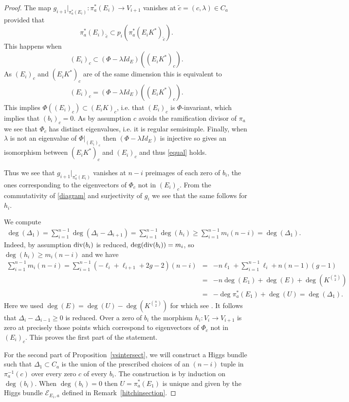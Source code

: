 \documentclass[12pt]{article}
\numberwithin{equation}{section}
\renewcommand{\div}{{\rm div}}
\theoremstyle{remark}
\theoremstyle{definition}
\numberwithin{theorem}{section}
\def\beq{\begin{eqnarray}}
\def\eeq{\end{eqnarray}}
\def\bes{\begin{eqnarray*}}
\def\ees{\end{eqnarray*}}
\def\calE{{\mathcal E}}
\renewcommand{\1}{\mathbbm{1}}
\begin{document}
\begin{proof}
	The map $g_{i+1}|_{\pi_a^*(E_{i})}:\pi_a^*(E_{i})\to V_{i+1}$ vanishes at $\tilde{c}=(c,\lambda)\in C_a$ provided that $$\pi_a^*(E_{i})_{\tilde{c}}\subset p_i(\pi_a^*(E_iK^*)_{\tilde{c}}).$$ This happens when
	$$(E_{i})_c\subset (\Phi-\lambda Id_{E})((E_iK^*)_c).$$ As $(E_{i})_c$ and $(E_iK^*)_c$ are of the same dimension this 
	is equivalent to \beq \label{equal}(E_{i})_c= (\Phi-\lambda Id_{E})((E_iK^*)_c).\eeq  This implies $\Phi((E_i)_c)\subset (E_iK)_c$, i.e. that $(E_i)_c$ is $\Phi$-invariant, which implies that $(b_i)_c=0$. As by assumption $c$ avoids the ramification divisor of $\pi_a$ we see that $\Phi_c$ has distinct eigenvalues, i.e. it is regular semisimple.  Finally, when $\lambda$ is not an eigenvalue of $\Phi|_{(E_i)_c}$ then $(\Phi-\lambda Id_{E})$ is injective so gives an isomorphism between   $(E_iK^*)_c$ and $(E_{i})_c$ and thus \eqref{equal} holds.
	
	Thus we see that $g_{i+1}|_{\pi_a^*(E_i)}$ vanishes at $n-i$ preimages of each zero of $b_i$, the ones corresponding to the eigenvectors of $\Phi_c$ not in $(E_i)_c$. From the commutativity of \eqref{diagram} and surjectivity of $g_i$ we see that the same follows for $h_i$. 
	
	We  compute \bes \deg(\Delta_1)=\sum_{i=1}^{n-1}\deg(\Delta_i-\Delta_{i+1}) = \sum_{i=1}^{n-1}\deg(h_i)  \geq \sum_{i=1}^{n-1} m_i (n-i)=\deg(\Delta_1).\ees Indeed, by  assumption $\div(b_i)$ is reduced, $\deg(\div(b_i))=m_i$, so $\deg(h_i)\geq m_i(n-i)$  and we have \bes \sum_{i=1}^{n-1}m_i(n-i)=\sum_{i=1}^{n-1}(-\ell_i+\ell_{i+1}+2g-2)(n-i)&=&-n\ell_1 +\sum_{i=1}^{n-1} \ell_i + n(n-1)(g-1)\\&=&-n\deg(E_1)+\deg(E)+\deg(K^{n\choose 2})\\&=&-\deg\pi_a^*(E_1)+\deg(U)=\deg(\Delta_1).\ees Here  we used $\deg(E)=\deg(U)-\deg(K^{{n\choose 2}})$ for which see \cite[\S 4]{beauville-etal}. 
	It follows that $\Delta_i-\Delta_{i-1}\geq 0$ is reduced. Over a zero of $b_i$ the morphism $h_i:V_i\to V_{i+1}$ is zero at precisely those points which correspond to eigenvectors of $\Phi_c$  not in $(E_i)_c$. This proves the first part of the statement. 
	
	For the second part of Proposition~\ref{vsintersect}, we will construct a Higgs bundle such that $\Delta_1\subset C_a$ is the union of the prescribed choices of an $(n-i)$ tuple in $\pi_a^{-1}(c)$ over every zero $c$ of every $b_i$. The construction is by induction on $\deg(b_i).$ When $\deg(b_i)=0$ then $U=\pi_a^*(E_1)$ is unique and given by the Higgs bundle $\calE_{E_1,a}$ defined   in Remark~\ref{hitchinsection}. 
	

\end{proof}
\end{document}
